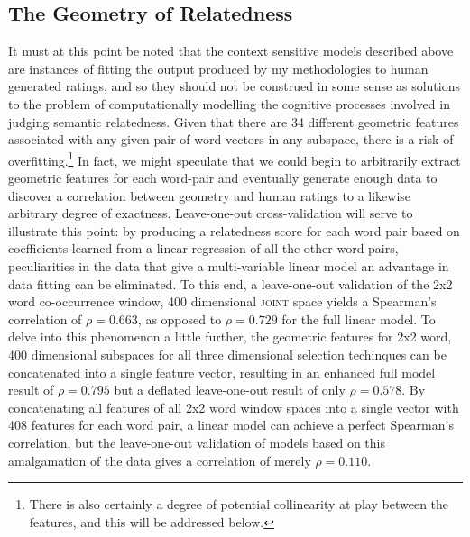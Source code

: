 \subsection{The Geometry of Relatedness}
It must at this point be noted that the context sensitive models described above are instances of fitting the output produced by my methodologies to human generated ratings, and so they should not be construed in some sense as solutions to the problem of computationally modelling the cognitive processes involved in judging semantic relatedness.  Given that there are 34 different geometric features associated with any given pair of word-vectors in any subspace, there is a risk of overfitting.\footnote{There is also certainly a degree of potential collinearity at play between the features, and this will be addressed below.}  In fact, we might speculate that we could begin to arbitrarily extract geometric features for each word-pair and eventually generate enough data to discover a correlation between geometry and human ratings to a likewise arbitrary degree of exactness.  Leave-one-out cross-validation will serve to illustrate this point: by producing a relatedness score for each word pair based on coefficients learned from a linear regression of all the other word pairs, peculiarities in the data that give a multi-variable linear model an advantage in data fitting can be eliminated.  To this end, a leave-one-out validation of the 2x2 word co-occurrence window, 400 dimensional \textsc{joint} space yields a Spearman's correlation of $\rho = 0.663$, as opposed to $\rho = 0.729$ for the full linear model.  To delve into this phenomenon a little further, the geometric features for 2x2 word, 400 dimensional subspaces for all three dimensional selection techinques can be concatenated into a single feature vector, resulting in an enhanced full model result of $\rho = 0.795$ but a deflated leave-one-out result of only $\rho = 0.578$.  By concatenating all features of all 2x2 word window spaces into a single vector with 408 features for each word pair, a linear model can achieve a perfect Spearman's correlation, but the leave-one-out validation of models based on this amalgamation of the data gives a correlation of merely $\rho = 0.110$.


